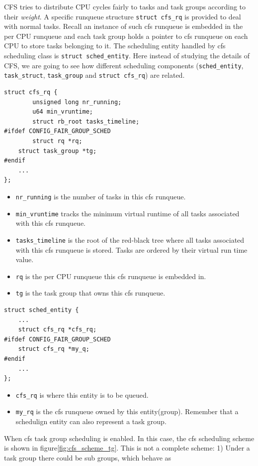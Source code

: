 CFS tries to distribute CPU cycles fairly to tasks and task groups according
to their \emph{weight}. A specific runqueue structure \texttt{struct cfs\_rq}
is provided to deal with normal tasks. Recall an instance of such cfs runqueue
is embedded in the per CPU runqueue and each task group holds a pointer
to cfs runqueue on each CPU to store tasks belonging to it.
The scheduling entity handled by cfs scheduling class is 
\texttt{struct sched\_entity}. Here instead of studying the details of
CFS, we are going to see how different scheduling components
(\texttt{sched\_entity}, \texttt{task\_struct}, \texttt{task\_group}
and \texttt{struct cfs\_rq}) are related.
\begin{lstlisting}
struct cfs_rq {
        unsigned long nr_running;
        u64 min_vruntime;
        struct rb_root tasks_timeline;
#ifdef CONFIG_FAIR_GROUP_SCHED
        struct rq *rq;  
	struct task_group *tg;
#endif
	...
};
\end{lstlisting}
\begin{itemize}
\item \texttt{nr\_running} is the number of tasks in this cfs runqueue.
\item \texttt{min\_vruntime} tracks the minimum virtual runtime of all
	tasks associated with this cfs runqueue.
\item \texttt{tasks\_timeline} is the root of the red-black tree where 
	all tasks associated with this cfs runqueue is stored. Tasks are 
	ordered by their virtual run time value.
\item \texttt{rq} is the per CPU runqueue this cfs runqueue is embedded in.
\item \texttt{tg} is the task group that owns this cfs runqueue.
\end{itemize}
\begin{lstlisting}
struct sched_entity {
	...
	struct cfs_rq *cfs_rq;
#ifdef CONFIG_FAIR_GROUP_SCHED
	struct cfs_rq *my_q;
#endif
	...
}; 
\end{lstlisting}
\begin{itemize}
\item \texttt{cfs\_rq} is where this entity is to be queued.
\item \texttt{my\_rq} is the cfs runqueue owned by this entity(group).
	Remember that a schedulign entity can also represent a task group.
\end{itemize}
When cfs task group scheduling is enabled. In this case, the cfs scheduling 
scheme is shown in figure\ref{fig:cfs_scheme_tg}. This is not a complete
scheme: 1) Under a task group there could be sub groups, which behave as 
